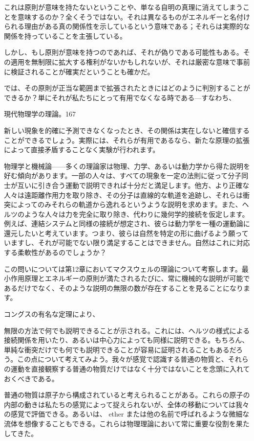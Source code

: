\documentclass[a4paper,11pt,openany]{ltjsbook}
\begin{document}
これは原則が意味を持たないということや、単なる自明の真理に消えてしまうことを意味するのか？全くそうではない。それは異なるものがエネルギーと名付けられる理由がある真の関係性を示しているという意味である；それらは実際的な関係を持っていることを主張している。

しかし、もし原則が意味を持つのであれば、それが偽りである可能性もある。その適用を無制限に拡大する権利がないかもしれないが、それは厳密な意味で事前に検証されることが確実だということも確かだ。

では、その原則が正当な範囲まで拡張されたときにはどのように判別することができるか？単にそれが私たちにとって有用でなくなる時である—すなわち、

現代物理学の理論。167

新しい現象を的確に予測できなくなったとき、その関係は実在しないと確信することができるでしょう。実際には、それらが有用であるなら、新たな原理の拡張によって直接矛盾することなく実験が行われます。

物理学と機械論——多くの理論家は物理、力学、あるいは動力学から得た説明を好む傾向があります。一部の人々は、すべての現象を一定の法則に従って分子同士が互いに引き合う運動で説明できれば十分だと満足します。他方、より正確な人々は遠距離作用力を取り除き、その分子は直線的な軌道を追跡し、それらは衝突によってのみそれらの軌道から逸れるというような説明を求めます。また、ヘルツのような人々は力を完全に取り除き、代わりに幾何学的接続を仮定します。例えば、連結システムと同様の接続が想定され、彼らは動力学を一種の運動論に還元したいと考えています。つまり、彼らは自然を特定の形に曲げるよう願っていますし、それが可能でない限り満足することはできません。自然はこれに対応する柔軟性があるのでしょうか？

この問いについては第12章においてマクスウェルの理論について考察します。最小作用原理とエネルギーの原則が満たされるたびに、常に機械的な説明が可能であるだけでなく、そのような説明の無限の数が存在することを見ることになります。

コングスの有名な定理により、


無限の方法で何でも説明できることが示される。これには、ヘルツの様式による接続関係を用いたり、あるいは中心力によっても同様に説明できる。もちろん、単純な衝突だけでも何でも説明できることが容易に証明されることもあるだろう。この点について考えてみよう。我々が感覚で認識する普通の物質と、それらの運動を直接観察する普通の物質だけではなく十分ではないことを念頭に入れておくべきである。

普通の物質は原子から構成されていると考えられることがある。これらの原子の内部の動きは私たちの感覚によって捉えられないが、全体の移動については我々の感覚で評価できる。あるいは、 ether または他の名前で呼ばれるような微細な流体を想像することもできる。これらは物理理論において常に重要な役割を果たしてきた。
\end{document}
